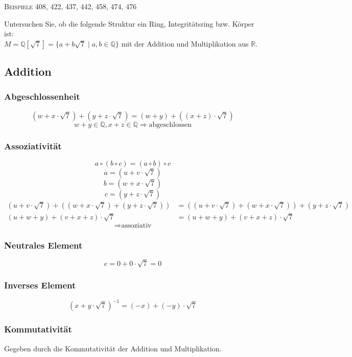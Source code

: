 \documentclass[a4paper, 12pt, margins=3cm]{homework}
\newcommand{\R}{\mathbb{R}}
\newcommand{\Q}{\mathbb{Q}}
\begin{document}
  \begin{center}
    \textsc{Beispiele 408, 422, 437, 442, 458, 474, 476}
  \end{center}


  \begin{problem}
    Untersuchen Sie, ob die folgende Struktur ein Ring, Integritätsring bzw. Körper
    ist:\\

    $M = \Q[\sqrt{7}] = \{ a+b\sqrt{7}\;|\;a,b\in \Q \}$ mit der Addition und
    Multiplikation aus $\R$. 
  \end{problem}
  \begin{solution}\hfill
    \subsection*{Addition}

      \subsubsection*{Abgeschlossenheit}
        \[ (w+x\cdot\sqrt{7}) + (y+z\cdot\sqrt{7}) = (w+y) + ((x+z)\cdot\sqrt{7}) \]
        \[ w+y\in\Q, x+z\in\Q \Longrightarrow \text{abgeschlossen} \]

      \subsubsection*{Assoziativität}
        \[ a\circ (b\circ c) = (a\circ b)\circ c \]
        \[ a = (u+v\cdot\sqrt{7}) \]
        \[ b = (w+x\cdot\sqrt{7}) \]
        \[ c = (y+z\cdot\sqrt{7}) \]
        \begin{align*}
          (u+v\cdot\sqrt{7}) + ((w+x\cdot\sqrt{7}) + (y+z\cdot\sqrt{7})) &= ((u+v\cdot\sqrt{7}) + (w+x\cdot\sqrt{7})) + (y+z\cdot\sqrt{7})\\ 
          (u+w+y) + (v+x+z)\cdot\sqrt{7} &= (u+w+y) + (v+x+z)\cdot\sqrt{7}
        \end{align*}
        \[ \Longrightarrow \text{assoziativ} \]

      \subsubsection*{Neutrales Element}
        \[ e = 0+0\cdot\sqrt{7}=0 \]

      \subsubsection*{Inverses Element}
        \[ (x+y\cdot\sqrt{7})^{-1} = (-x) + (-y)\cdot\sqrt{7} \]

      \subsubsection*{Kommutativität}
        Gegeben durch die Kommutativität der Addition und Multiplikation.
  \end{solution}
\end{document}
